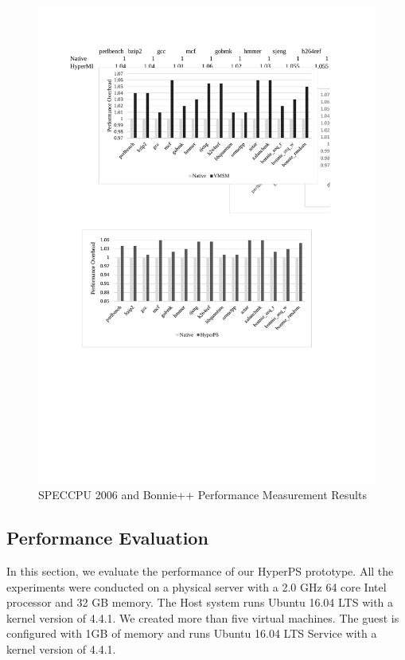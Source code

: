 \begin{figure}[htpb]
    \centering
    \includegraphics[width=0.95\linewidth]{IMG/performance.pdf}
    \caption{SPECCPU 2006 and Bonnie++ Performance Measurement Results}%
    \label{fig5}
\end{figure}

\subsection{Performance Evaluation}
In this section, we evaluate the performance of our HyperPS prototype. All the experiments were conducted on a physical server with a 2.0 GHz 64 core Intel processor and 32 GB memory. The Host system runs Ubuntu 16.04 LTS with a kernel version of 4.4.1. We created more than five virtual machines. The guest is configured with 1GB of memory and runs Ubuntu 16.04 LTS Service with a kernel version of 4.4.1. 


